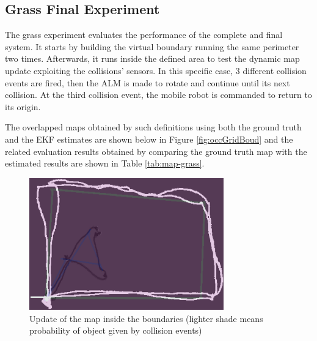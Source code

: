 \subsection{Grass Final Experiment}
\noindent
The grass experiment evaluates the performance of the complete and final system.
It starts by building the virtual boundary running the same perimeter two times.
Afterwards, it runs inside the defined area to test the dynamic map update exploiting the collisions' sensors.
In this specific case, 3 different collision events are fired, then the \gls{ALM} is made to rotate and continue until its next collision.
At the third collision event, the mobile robot is commanded to return to its origin.


The overlapped maps obtained by such definitions using both the ground truth and the \gls{EKF} estimates are shown below in Figure \ref{fig:occGridBoud} and the related evaluation results obtained by comparing the ground truth map with the estimated results are shown in Table  \ref{tab:map-grass}.

\begin{figure}[!ht]
	\begin{center}
		\includegraphics[width=0.75\textwidth]{Images/5-Results/Grass5.png}
	\end{center}
	\caption{Update of the map inside the boundaries (lighter shade means probability of object given by collision events)}
	\label{fig:occGridUpdate}
\end{figure}

